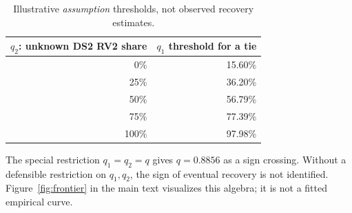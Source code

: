 \begin{table}[h!]
\centering\small
\caption{Illustrative \emph{assumption} thresholds, not observed recovery estimates.}
\label{tab:appendix-frontier}
\begin{tabular}{rr}
\toprule $q_2$: unknown DS2 RV2 share & $q_1$ threshold for a tie \\ \midrule
0\% & 15.60\%\\
25\% & 36.20\%\\
50\% & 56.79\%\\
75\% & 77.39\%\\
100\% & 97.98\%\\\bottomrule
\end{tabular}
\end{table}
The special restriction $q_1=q_2=q$ gives $q=0.8856$ as a sign crossing. Without a defensible restriction on $q_1,q_2$, the sign of eventual recovery is not identified. Figure~\ref{fig:frontier} in the main text visualizes this algebra; it is not a fitted empirical curve.

